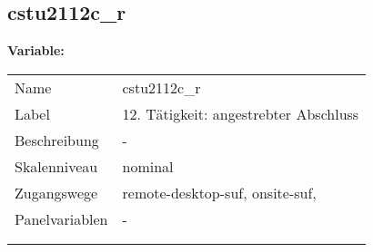 	
	
	\subsection{cstu2112c\_r}
	\label{subSection:cstu2112c_r}

	\noindent\textbf{Variable:}\\
		\begin{tabular}{lL{11.3cm}}
			\label{tableVariable:cstu2112c_r}
			Name & cstu2112c\_r \\
			Label & 12. Tätigkeit: angestrebter Abschluss \\
			Beschreibung & - \\
			Skalenniveau & nominal \\
			Zugangswege &
				remote-desktop-suf,
				onsite-suf,
 \\
			Panelvariablen & -
			 \\
			 \\
 \\
		\end{tabular}






